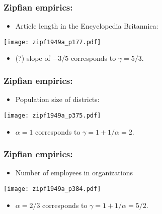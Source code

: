 \begin{frame}
  \frametitle{Zipfian empirics:}

  \begin{itemize}
  \item Article length in the Encyclopedia Britannica:
  \end{itemize}
  \centering
  \texttt{[image: zipf1949a\_p177.pdf]}
  \begin{itemize}
  \item (?) slope of $-3/5$ corresponds to $\gamma=5/3$.
  \end{itemize}

\end{frame}



\begin{frame}
  \frametitle{Zipfian empirics:}

  \begin{itemize}
  \item Population size of districts:
  \end{itemize}
  \centering
  \texttt{[image: zipf1949a\_p375.pdf]}
  \begin{itemize}
  \item $\alpha=1$ corresponds to $\gamma=1+1/\alpha=2$.
  \end{itemize}

\end{frame}

\begin{frame}
  \frametitle{Zipfian empirics:}

  \begin{itemize}
  \item Number of employees in organizations
  \end{itemize}
  \begin{center}
    \texttt{[image: zipf1949a\_p384.pdf]}
  \end{center}
  \begin{itemize}
  \item $\alpha=2/3$ corresponds to $\gamma=1+1/\alpha=5/2$.
  \end{itemize}

\end{frame}


